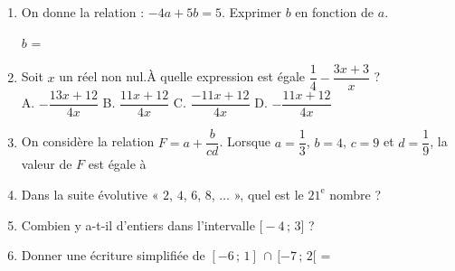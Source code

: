 \documentclass[a4paper,11pt]{article}
\begin{document}
\begin{seance}{} %

\begin{enumerate}
\item On donne la relation : $-4a+5b=5$. Exprimer $b$ en fonction de $a$.

$b$ = \dotfill


\item Soit $x$ un réel non nul.À quelle expression est égale $\dfrac{1}{4}-\dfrac{3x+3}{x}$ ?\\ 
    
    A. $-\dfrac{13x +12}{4x}$ \qquad B. $\dfrac{11x +12}{4x}$ \qquad C. $\dfrac{-11x +12}{4x}$ \qquad D. $-\dfrac{11x +12}{4x}$\qquad  
 \dotfill


\item On considère la relation $F=a+\dfrac{b}{cd}$. Lorsque $a=\dfrac{1}{3}$, $b=4$, $c=9$ et $d=\dfrac{1}{9}$, la valeur de $F$ est égale à \dotfill

\item Dans la suite évolutive « $2$, $4$, $6$, $8$, $\ldots$ », quel est le $21^{\text{e}}$ nombre ?

\dotfill

\item Combien y a-t-il d'entiers dans l'intervalle $\bigg[-4  \, ; \, 3\bigg]$ ?
\dotfill

\item Donner une écriture simplifiée de $[-6\,;\,1]\,\cap \,[ -7\,;\,2[$ = \dotfill
\end{enumerate}

\end{seance}
\end{document}
